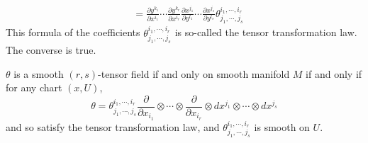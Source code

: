 \begin{enumerate}[label=\arabic{*}.]
\begin{rmk}
\begin{equation*}
\begin{aligned}
				&= \frac{\partial y^{k_1}}{\partial x^{i_1}}\cdots \frac{\partial y^{k_r}}{\partial x^{i_r}}\frac{\partial x^{j_1}}{\partial y^{l_1}}\cdots\frac{\partial x^{j_s}}{\partial y^{l_s}}\theta_{j_1,\cdots,j_s}^{i_1,\cdots,i_r}
			\end{aligned}
		\end{equation*}
		This formula of the coefficients $\theta_{j_1,\cdots,j_s}^{i_1,\cdots,i_r}$ is so-called the tensor transformation law. The converse is true.
	\end{rmk}
	\begin{lem}
		$\theta$ is a smooth $(r,s)$-tensor field if and only on smooth manifold $M$ if and only if for any chart $(x,U)$,
		\begin{equation*}
			\theta = \theta_{j_1,\cdots,j_s}^{i_1,\cdots,i_r}\frac{\partial}{\partial x_{i_1}}\otimes \cdots \otimes\frac{\partial}{\partial x_{i_r}}\otimes dx^{j_1}\otimes\cdots \otimes dx^{j_s}
		\end{equation*}
		and so satisfy the tensor transformation law, and $\theta_{j_1,\cdots,j_s}^{i_1,\cdots,i_r}$ is smooth on $U$.
	\end{lem}


\end{enumerate}
